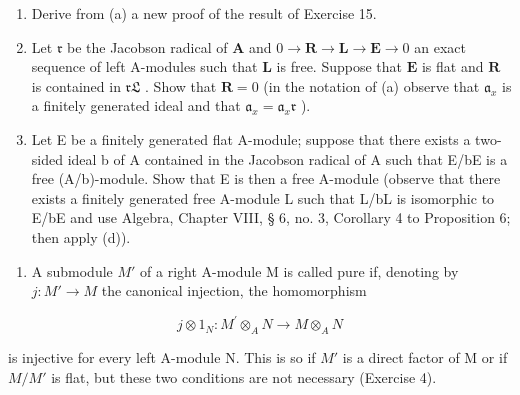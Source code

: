 \begin{enumerate}
\def\labelenumi{(\alph{enumi})}
\setcounter{enumi}{2}
\item
  Derive from (a) a new proof of the result of Exercise 15.
\item
  Let \(\mathfrak{r}\) be the Jacobson radical of \(\mathbf{A}\) and \(0 \to \mathbf{R} \to \mathbf{L} \to \mathbf{E} \to 0\) an exact sequence of left A-modules such that \(\mathbf{L}\) is free. Suppose that \(\mathbf{E}\) is flat and \(\mathbf{R}\) is contained in \(\mathfrak{rL}\) . Show that \(\mathbf{R} = 0\) (in the notation of (a) observe that \(\mathfrak{a}_x\) is a finitely generated ideal and that \(\mathfrak{a}_x = \mathfrak{a}_x\mathfrak{r}\) ).
\item
  Let E be a finitely generated flat A-module; suppose that there exists a two-sided ideal b of A contained in the Jacobson radical of A such that E/bE is a free (A/b)-module. Show that E is then a free A-module (observe that there exists a finitely generated free A-module L such that L/bL is isomorphic to E/bE and use Algebra, Chapter VIII, § 6, no. 3, Corollary 4 to Proposition 6; then apply (d)).
\end{enumerate}

\begin{enumerate}
\def\labelenumi{\arabic{enumi}.}
\setcounter{enumi}{23}
\tightlist
\item
  A submodule \(M'\) of a right A-module M is called pure if, denoting by \(j: M' \rightarrow M\) the canonical injection, the homomorphism
\end{enumerate}

\[
j \otimes 1 _ {N} \colon M ^ {\prime} \otimes_ {A} N \rightarrow M \otimes_ {A} N
\]

is injective for every left A-module N. This is so if \(M'\) is a direct factor of M or if \(M/M'\) is flat, but these two conditions are not necessary (Exercise 4).

